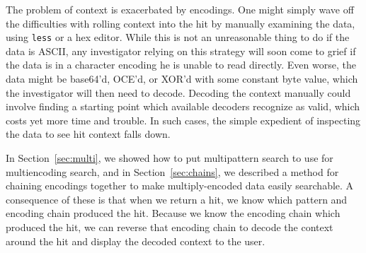 \documentclass[5p,final,number,sort&compress]{elsarticle}
\begin{document}
The problem of context is exacerbated by encodings. One might simply wave off the difficulties with rolling context into the hit by manually examining the data, using \texttt{less} or a hex editor. While this is not an unreasonable thing to do if the data is ASCII, any investigator relying on this strategy will soon come to grief if the data is in a character encoding he is unable to read directly. Even worse, the data might be base64'd, OCE'd, or XOR'd with some constant byte value, which the investigator will then need to decode. Decoding the context manually could involve finding a starting point which available decoders recognize as valid, which costs yet more time and trouble. In such cases, the simple expedient of inspecting the data to see hit context falls down.

In Section~\ref{sec:multi}, we showed how to put multipattern search to use for multiencoding search, and in Section~\ref{sec:chains}, we described a method for chaining encodings together to make multiply-encoded data easily searchable. A consequence of these is that when we return a hit, we know which pattern and encoding chain produced the hit. Because we know the encoding chain which produced the hit, we can reverse that encoding chain to decode the context around the hit and display the decoded context to the user.
\end{document}
